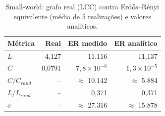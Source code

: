 \begin{table}[t]
  \caption{Small-world: grafo real (LCC) contra Erd\H{o}s--Rényi equivalente (média de 5 realizações) e valores analíticos.}
  \label{tab:smallworld}
\small
\begin{tabular}{lrrr}
  \toprule
  Métrica & Real & ER medido & ER analítico \\
  \midrule
  $L$ & 4,127 & 11,116 & 11,137 \\
  $C$ & 0,0791 & $7{,}8\times10^{-6}$ & $1{,}3\times10^{-5}$ \\
  $C/C_{rand}$ & -- & $\approx$ 10.142 & $\approx$ 5.884 \\
  $L/L_{rand}$ & -- & 0,371 & 0,371 \\
  $\sigma$ & -- & $\approx$ 27.316 & $\approx$ 15.878 \\
  \bottomrule
\end{tabular}
\end{table}
